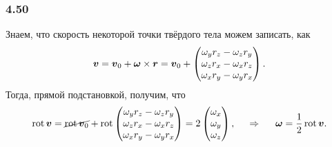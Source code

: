 \subsubsection*{4.50}

Знаем, что скорость некоторой точки твёрдого тела можем записать, как
$$
    \mbox{\boldmath $v$} = \mbox{\boldmath $v$}_0 + \mbox{\boldmath $\omega$}\times \mbox{\boldmath $r$} = \mbox{\boldmath $v$}_0 + \begin{pmatrix}
        \omega_y r_z - \omega_z r_y \\
        \omega_z r_x - \omega_x r_z \\
        \omega_x r_y - \omega_y r_x
    \end{pmatrix}.
$$
Тогда, прямой подстановкой, получим, что
$$
    \mathop{\mathrm{rot}}\nolimits \mbox{\boldmath $v$} = \cancel{\mathop{\mathrm{rot}}\nolimits \mbox{\boldmath $v$}_0} +
    \mathop{\mathrm{rot}}\nolimits \begin{pmatrix}
        \omega_y r_z - \omega_z r_y \\
        \omega_z r_x - \omega_x r_z \\
        \omega_x r_y - \omega_y r_x
    \end{pmatrix} =
    2 \begin{pmatrix}
        \omega_x \\ \omega_y \\ \omega_z
    \end{pmatrix},
    \hspace{0.5cm} \Rightarrow \hspace{0.5cm} 
    \mbox{\boldmath $\omega$} = \frac{1}{2} \mathop{\mathrm{rot}}\nolimits \mbox{\boldmath $v$} .
$$




